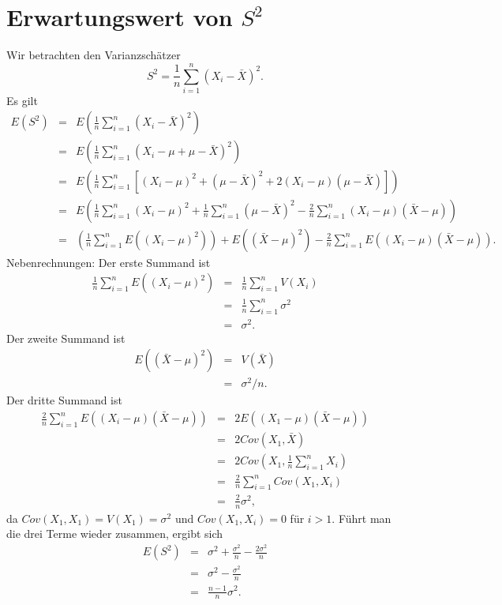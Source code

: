 \documentclass{article}
\begin{document}
\section*{Erwartungswert von $S^2$}
Wir betrachten den Varianzschätzer 
\[
S^{2}=\frac{1}{n}\sum_{i=1}^{n}\left( X_{i}-\bar{X}\right) ^{2}.
\]
Es gilt
\begin{eqnarray*}
E\left( S^{2}\right)  &=&E\left( \frac{1}{n}\sum_{i=1}^{n}\left( X_{i}-\bar{X%
}\right) ^{2}\right)  \\
&=&E\left( \frac{1}{n}\sum_{i=1}^{n}\left( X_{i}-\mu +\mu -\bar{X}\right)
^{2}\right)  \\
&=&E\left( \frac{1}{n}\sum_{i=1}^{n}\left[ \left( X_{i}-\mu \right)
^{2}+\left( \mu -\bar{X}\right) ^{2}+2\left( X_{i}-\mu \right) \left( \mu -%
\bar{X}\right) \right] \right)  \\
&=&E\left( \frac{1}{n}\sum_{i=1}^{n}\left( X_{i}-\mu \right) ^{2}+\frac{1}{n}%
\sum_{i=1}^{n}\left( \mu -\bar{X}\right) ^{2}-\frac{2}{n}\sum_{i=1}^{n}%
\left( X_{i}-\mu \right) \left( \bar{X}-\mu \right) \right)  \\
&=&\left( \frac{1}{n}\sum_{i=1}^{n}E\left( \left( X_{i}-\mu \right)
^{2}\right) \right) +E\left( \left( \bar{X}-\mu \right) ^{2}\right) -\frac{2%
}{n}\sum_{i=1}^{n}E\left( \left( X_{i}-\mu \right) \left( \bar{X}-\mu
\right) \right) .
\end{eqnarray*}%
Nebenrechnungen: Der erste Summand ist%
\begin{eqnarray*}
\frac{1}{n}\sum_{i=1}^{n}E\left( \left( X_{i}-\mu \right) ^{2}\right)  &=&%
\frac{1}{n}\sum_{i=1}^{n}V(X_{i}) \\
&=&\frac{1}{n}\sum_{i=1}^{n}\sigma ^{2} \\
&=&\sigma ^{2}.
\end{eqnarray*}%
Der zweite Summand ist 
\begin{eqnarray*}
E\left( \left( \bar{X}-\mu \right) ^{2}\right)  &=&V(\bar{X}) \\
&=&\sigma ^{2}/n.
\end{eqnarray*}%
Der dritte Summand ist%
\begin{eqnarray*}
\frac{2}{n}\sum_{i=1}^{n}E\left( \left( X_{i}-\mu \right) \left( \bar{X}-\mu
\right) \right)  &=&2E\left( \left( X_{1}-\mu \right) \left( \bar{X}-\mu
\right) \right)  \\
&=&2Cov(X_{1},\bar{X}) \\
&=&2Cov\left( X_{1},\frac{1}{n}\sum_{i=1}^{n}X_{i}\right)  \\
&=&\frac{2}{n}\sum_{i=1}^{n}Cov(X_{1},X_{i}) \\
&=&\frac{2}{n}\sigma ^{2},
\end{eqnarray*}%
da $Cov(X_{1},X_{1})=V(X_{1})=\sigma ^{2}$ und $Cov(X_{1},X_{i})=0$ f\"{u}r $%
i>1.$ F\"{u}hrt man die drei Terme wieder zusammen, ergibt sich%
\begin{eqnarray*}
E\left( S^{2}\right)  &=&\sigma ^{2}+\frac{\sigma ^{2}}{n}-\frac{2\sigma ^{2}%
}{n} \\
&=&\sigma ^{2}-\frac{\sigma ^{2}}{n} \\
&=&\frac{n-1}{n}\sigma ^{2}.
\end{eqnarray*}%
\end{document}
